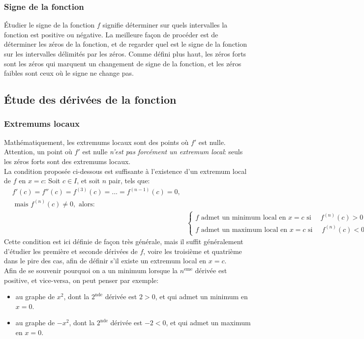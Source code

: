 \documentclass{article}
\begin{document}
\subsubsection{Signe de la fonction}
Étudier le signe de la fonction \(f\) signifie déterminer sur quels intervalles la fonction est positive ou négative. La meilleure façon de procéder est de déterminer les zéros de la fonction, et de regarder quel est le signe de la fonction sur les intervalles délimités par les zéros. Comme défini plus haut, les zéros forts sont les zéros qui marquent un changement de signe de la fonction, et les zéros faibles sont ceux où le signe ne change pas.

\subsection{Étude des dérivées de la fonction}

\subsubsection{Extremums locaux}
Mathématiquement, les extremums locaux sont des points où \(f'\) est nulle. Attention, un point où \(f'\) est nulle \emph{n'est pas forcément un extremum local}: seuls les zéros forts sont des extremums locaux. \\

La condition proposée ci-dessous est suffisante à l'existence d'un extremum local de \(f\) en \(x = c\):
Soit \(c \in I\), et soit \(n\) pair, tels que:
\begin{align*}
	&f'(c) = f''(c) = f^{(3)}(c) = ... = f^{(n-1)}(c) = 0, \\ 
	&\text{ mais } f^{(n)}(c) \neq 0, \text{ alors:} \\
	& &\begin{cases}
		f \text{ admet un minimum local en } x = c \text{ si } \quad f^{(n)}(c) > 0  \\
		f \text{ admet un maximum local en } x = c \text{ si } \quad f^{(n)}(c) < 0  
	\end{cases}
\end{align*}
Cette condition est ici définie de façon très générale, mais il suffit généralement d'étudier les première et seconde dérivées de \(f\), voire les troisième et quatrième dans le pire des cas, afin de définir s'il existe un extremum local en \(x = c\). \\
Afin de se souvenir pourquoi on a un minimum lorsque la \(n^\text{eme}\) dérivée est positive, et vice-versa, on peut penser par exemple:
\begin{itemize}
	\item au graphe de \(x^2\), dont la \(2^\text{nde}\) dérivée est \(2 > 0\), et qui admet un minimum en \(x = 0\).
	\item au graphe de \(-x^2\), dont la \(2^\text{nde}\) dérivée est  \(-2 < 0\), et qui admet un maximum en \(x = 0\).
\end{itemize}
\end{document}
